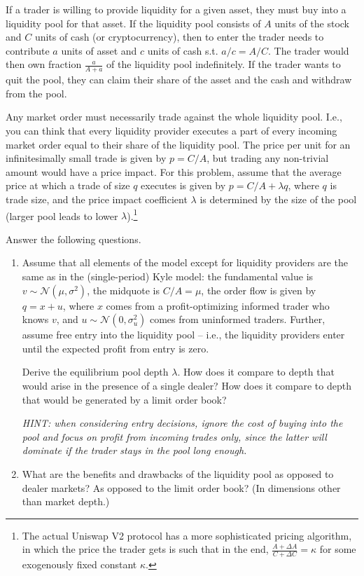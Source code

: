 	If a trader is willing to provide liquidity for a given asset, they must buy into a liquidity pool for that asset. If the liquidity pool consists of $A$ units of the stock and $C$ units of cash (or cryptocurrency), then to enter the trader needs to contribute $a$ units of asset and $c$ units of cash s.t. $a/c = A/C$. The trader would then own fraction $\frac{a}{A+a}$ of the liquidity pool indefinitely. If the trader wants to quit the pool, they can claim their share of the asset and the cash and withdraw from the pool.
	
	Any market order must necessarily trade against the whole liquidity pool. I.e., you can think that every liquidity provider executes a part of every incoming market order equal to their share of the liquidity pool. The price per unit for an infinitesimally small trade is given by $p=C/A$, but trading any non-trivial amount would have a price impact. For this problem, assume that the average price at which a trade of size $q$ executes is given by $p = C/A + \lambda q$, where $q$ is trade size, and the price impact coefficient $\lambda$ is determined by the size of the pool (larger pool leads to lower $\lambda$).\footnote{The actual Uniswap V2 protocol has a more sophisticated pricing algorithm, in which the price the trader gets is such that in the end, $\frac{A+\varDelta A}{C+\varDelta C} = \kappa$ for some exogenously fixed constant $\kappa$.}
	
	Answer the following questions.
	\begin{enumerate}
		\item Assume that all elements of the model except for liquidity providers are the same as in the (single-period) Kyle model: the fundamental value is $v \sim \mathcal{N}(\mu,\sigma^2)$, the midquote is $C/A=\mu$, the order flow is given by $q=x+u$, where $x$ comes from a profit-optimizing informed trader who knows $v$, and $u \sim \mathcal{N}(0,\sigma^2_u)$ comes from uninformed traders. Further, assume free entry into the liquidity pool -- i.e., the liquidity providers enter until the expected profit from entry is zero. 
		
		Derive the equilibrium pool depth $\lambda$. How does it compare to depth that would arise in the presence of a single dealer? How does it compare to depth that would be generated by a limit order book?
		
		\emph{HINT: when considering entry decisions, ignore the cost of buying into the pool and focus on profit from incoming trades only, since the latter will dominate if the trader stays in the pool long enough.}
		
		\item What are the benefits and drawbacks of the liquidity pool as opposed to dealer markets? As opposed to the limit order book? (In dimensions other than market depth.)
	\end{enumerate}


